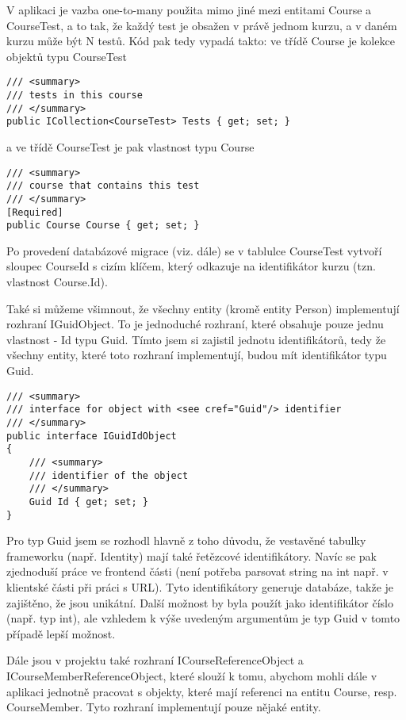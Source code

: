 V aplikaci je vazba one-to-many použita mimo jiné mezi entitami Course a CourseTest, a to tak, že každý test je obsažen v právě jednom kurzu, a v daném kurzu může být N testů.
Kód pak tedy vypadá takto: ve třídě Course je kolekce objektů typu CourseTest

\begin{lstlisting}
/// <summary>
/// tests in this course
/// </summary>
public ICollection<CourseTest> Tests { get; set; }
\end{lstlisting}

a ve třídě CourseTest je pak vlastnost typu Course

\begin{lstlisting}
/// <summary>
/// course that contains this test
/// </summary>
[Required]
public Course Course { get; set; }
\end{lstlisting}

Po provedení databázové migrace (viz. dále) se v tablulce CourseTest vytvoří sloupec CourseId s cizím klíčem, který odkazuje na identifikátor kurzu (tzn. vlastnost Course.Id).

Také si můžeme všimnout, že všechny entity (kromě entity Person) implementují rozhraní IGuidObject. To je jednoduché rozhraní, které obsahuje pouze jednu vlastnost - Id typu Guid. Tímto jsem si zajistil jednotu identifikátorů, tedy že všechny entity, které toto rozhraní implementují, budou mít identifikátor typu Guid.

\begin{lstlisting}
/// <summary>
/// interface for object with <see cref="Guid"/> identifier
/// </summary>
public interface IGuidIdObject
{
	/// <summary>
	/// identifier of the object
	/// </summary>
	Guid Id { get; set; }
}
\end{lstlisting}


Pro typ Guid jsem se rozhodl hlavně z toho důvodu, že vestavěné tabulky frameworku (např. Identity) mají také řetězcové identifikátory. Navíc se pak zjednoduší práce ve frontend části (není potřeba parsovat string na int např. v klientské části při práci s URL). Tyto identifikátory generuje databáze, takže je zajištěno, že jsou unikátní.
Další možnost by byla použít jako identifikátor číslo (např. typ int), ale vzhledem k výše uvedeným argumentům je typ Guid v tomto případě lepší možnost.

Dále jsou v projektu také rozhraní ICourseReferenceObject a ICourseMemberReferenceObject, které slouží k tomu, abychom mohli dále v aplikaci jednotně pracovat s objekty, které mají referenci na entitu Course, resp. CourseMember. Tyto rozhraní implementují pouze nějaké entity.

